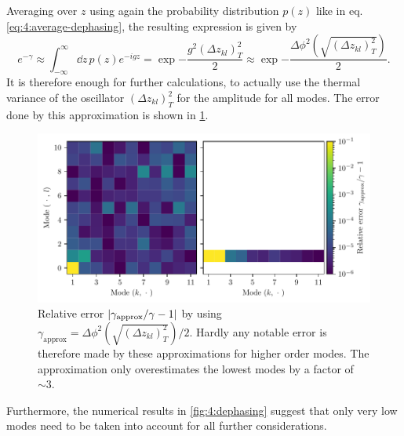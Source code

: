 Averaging over $z$ using again the probability distribution $p(z)$ like in eq. \eqref{eq:4:average-dephasing}, the resulting expression is given by
\begin{equation}
  e^{-\gamma} \approx \int_{-\infty}^{\infty} \dd z \, p(z) e^{-i g z} = \exp{-\frac{g^2 (\Delta z_{kl})^2_T}{2}} \approx \exp{-\frac{\Delta\phi^2\left(\sqrt{(\Delta z_{kl})^2_T}\right)}{2}} .
\end{equation}
It is therefore enough for further calculations, to actually use the thermal variance of the oscillator $(\Delta z_{kl})^2_T$ for the amplitude for all modes. The error done by this approximation is shown in \cref{fig:4:dephasing-approximation-error}.
\begin{figure}[!htbp]
  \centering
  \includegraphics[width=\textwidth]{./../figures/vibrations/vibrational-dephasing-approximation-error.pdf}
  \caption{Relative error $\left\lvert\gamma_\mathrm{approx} / \gamma - 1\right\rvert$ by using $\gamma_\mathrm{approx} = \Delta\phi^2\left(\sqrt{(\Delta z_{kl})^2_T}\right)/2$. Hardly any notable error is therefore made by these approximations for higher order modes. The approximation only overestimates the lowest modes by a factor of $\sim 3$.}
  \label{fig:4:dephasing-approximation-error}
\end{figure}
Furthermore, the numerical results in \cref{fig:4:dephasing} suggest that only very low modes need to be taken into account for all further considerations.

